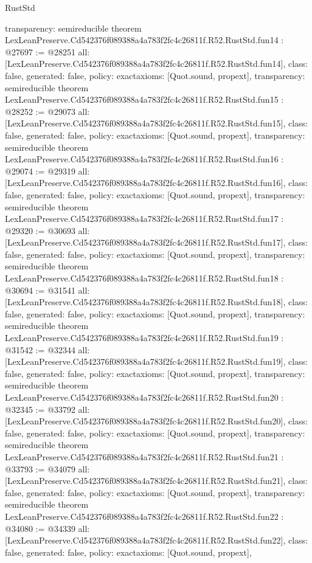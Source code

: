 \begin{lexlean}{RustStd}
\begin{coremodule}
{  transparency: semireducible
}
theorem LexLeanPreserve.Cd542376f089388a4a783f2fc4c26811f.R52.RustStd.fun14 : @27697 := @28251 {
  all: [LexLeanPreserve.Cd542376f089388a4a783f2fc4c26811f.R52.RustStd.fun14],
  class: false,
  generated: false,
  policy: exact{axioms: [Quot.sound, propext]},
  transparency: semireducible
}
theorem LexLeanPreserve.Cd542376f089388a4a783f2fc4c26811f.R52.RustStd.fun15 : @28252 := @29073 {
  all: [LexLeanPreserve.Cd542376f089388a4a783f2fc4c26811f.R52.RustStd.fun15],
  class: false,
  generated: false,
  policy: exact{axioms: [Quot.sound, propext]},
  transparency: semireducible
}
theorem LexLeanPreserve.Cd542376f089388a4a783f2fc4c26811f.R52.RustStd.fun16 : @29074 := @29319 {
  all: [LexLeanPreserve.Cd542376f089388a4a783f2fc4c26811f.R52.RustStd.fun16],
  class: false,
  generated: false,
  policy: exact{axioms: [Quot.sound, propext]},
  transparency: semireducible
}
theorem LexLeanPreserve.Cd542376f089388a4a783f2fc4c26811f.R52.RustStd.fun17 : @29320 := @30693 {
  all: [LexLeanPreserve.Cd542376f089388a4a783f2fc4c26811f.R52.RustStd.fun17],
  class: false,
  generated: false,
  policy: exact{axioms: [Quot.sound, propext]},
  transparency: semireducible
}
theorem LexLeanPreserve.Cd542376f089388a4a783f2fc4c26811f.R52.RustStd.fun18 : @30694 := @31541 {
  all: [LexLeanPreserve.Cd542376f089388a4a783f2fc4c26811f.R52.RustStd.fun18],
  class: false,
  generated: false,
  policy: exact{axioms: [Quot.sound, propext]},
  transparency: semireducible
}
theorem LexLeanPreserve.Cd542376f089388a4a783f2fc4c26811f.R52.RustStd.fun19 : @31542 := @32344 {
  all: [LexLeanPreserve.Cd542376f089388a4a783f2fc4c26811f.R52.RustStd.fun19],
  class: false,
  generated: false,
  policy: exact{axioms: [Quot.sound, propext]},
  transparency: semireducible
}
theorem LexLeanPreserve.Cd542376f089388a4a783f2fc4c26811f.R52.RustStd.fun20 : @32345 := @33792 {
  all: [LexLeanPreserve.Cd542376f089388a4a783f2fc4c26811f.R52.RustStd.fun20],
  class: false,
  generated: false,
  policy: exact{axioms: [Quot.sound, propext]},
  transparency: semireducible
}
theorem LexLeanPreserve.Cd542376f089388a4a783f2fc4c26811f.R52.RustStd.fun21 : @33793 := @34079 {
  all: [LexLeanPreserve.Cd542376f089388a4a783f2fc4c26811f.R52.RustStd.fun21],
  class: false,
  generated: false,
  policy: exact{axioms: [Quot.sound, propext]},
  transparency: semireducible
}
theorem LexLeanPreserve.Cd542376f089388a4a783f2fc4c26811f.R52.RustStd.fun22 : @34080 := @34339 {
  all: [LexLeanPreserve.Cd542376f089388a4a783f2fc4c26811f.R52.RustStd.fun22],
  class: false,
  generated: false,
  policy: exact{axioms: [Quot.sound, propext]},
}
\end{coremodule}
\end{lexlean}
